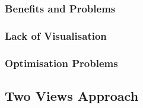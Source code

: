 \documentclass{article}
\begin{document}
 \subsubsection{Benefits and Problems} 
 
 \subsubsection{Lack of Visualisation} 

\subsubsection{Optimisation Problems} 

\subsection{Two Views Approach} 
\end{document}

